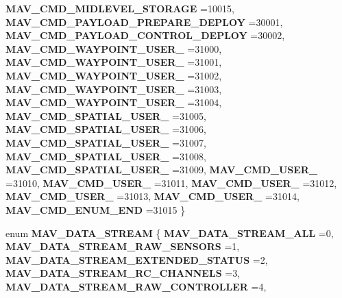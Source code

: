 \begin{DoxyCompactItemize}
\newline
\textbf{ M\+A\+V\+\_\+\+C\+M\+D\+\_\+\+M\+I\+D\+L\+E\+V\+E\+L\+\_\+\+S\+T\+O\+R\+A\+GE} =10015, 
\textbf{ M\+A\+V\+\_\+\+C\+M\+D\+\_\+\+P\+A\+Y\+L\+O\+A\+D\+\_\+\+P\+R\+E\+P\+A\+R\+E\+\_\+\+D\+E\+P\+L\+OY} =30001, 
\textbf{ M\+A\+V\+\_\+\+C\+M\+D\+\_\+\+P\+A\+Y\+L\+O\+A\+D\+\_\+\+C\+O\+N\+T\+R\+O\+L\+\_\+\+D\+E\+P\+L\+OY} =30002, 
\textbf{ M\+A\+V\+\_\+\+C\+M\+D\+\_\+\+W\+A\+Y\+P\+O\+I\+N\+T\+\_\+\+U\+S\+E\+R\+\_} =31000, 
\newline
\textbf{ M\+A\+V\+\_\+\+C\+M\+D\+\_\+\+W\+A\+Y\+P\+O\+I\+N\+T\+\_\+\+U\+S\+E\+R\+\_} =31001, 
\textbf{ M\+A\+V\+\_\+\+C\+M\+D\+\_\+\+W\+A\+Y\+P\+O\+I\+N\+T\+\_\+\+U\+S\+E\+R\+\_} =31002, 
\textbf{ M\+A\+V\+\_\+\+C\+M\+D\+\_\+\+W\+A\+Y\+P\+O\+I\+N\+T\+\_\+\+U\+S\+E\+R\+\_} =31003, 
\textbf{ M\+A\+V\+\_\+\+C\+M\+D\+\_\+\+W\+A\+Y\+P\+O\+I\+N\+T\+\_\+\+U\+S\+E\+R\+\_} =31004, 
\newline
\textbf{ M\+A\+V\+\_\+\+C\+M\+D\+\_\+\+S\+P\+A\+T\+I\+A\+L\+\_\+\+U\+S\+E\+R\+\_} =31005, 
\textbf{ M\+A\+V\+\_\+\+C\+M\+D\+\_\+\+S\+P\+A\+T\+I\+A\+L\+\_\+\+U\+S\+E\+R\+\_} =31006, 
\textbf{ M\+A\+V\+\_\+\+C\+M\+D\+\_\+\+S\+P\+A\+T\+I\+A\+L\+\_\+\+U\+S\+E\+R\+\_} =31007, 
\textbf{ M\+A\+V\+\_\+\+C\+M\+D\+\_\+\+S\+P\+A\+T\+I\+A\+L\+\_\+\+U\+S\+E\+R\+\_} =31008, 
\newline
\textbf{ M\+A\+V\+\_\+\+C\+M\+D\+\_\+\+S\+P\+A\+T\+I\+A\+L\+\_\+\+U\+S\+E\+R\+\_} =31009, 
\textbf{ M\+A\+V\+\_\+\+C\+M\+D\+\_\+\+U\+S\+E\+R\+\_} =31010, 
\textbf{ M\+A\+V\+\_\+\+C\+M\+D\+\_\+\+U\+S\+E\+R\+\_} =31011, 
\textbf{ M\+A\+V\+\_\+\+C\+M\+D\+\_\+\+U\+S\+E\+R\+\_} =31012, 
\newline
\textbf{ M\+A\+V\+\_\+\+C\+M\+D\+\_\+\+U\+S\+E\+R\+\_} =31013, 
\textbf{ M\+A\+V\+\_\+\+C\+M\+D\+\_\+\+U\+S\+E\+R\+\_} =31014, 
\textbf{ M\+A\+V\+\_\+\+C\+M\+D\+\_\+\+E\+N\+U\+M\+\_\+\+E\+ND} =31015
 \}
\item 
enum \textbf{ M\+A\+V\+\_\+\+D\+A\+T\+A\+\_\+\+S\+T\+R\+E\+AM} \{ \newline
\textbf{ M\+A\+V\+\_\+\+D\+A\+T\+A\+\_\+\+S\+T\+R\+E\+A\+M\+\_\+\+A\+LL} =0, 
\textbf{ M\+A\+V\+\_\+\+D\+A\+T\+A\+\_\+\+S\+T\+R\+E\+A\+M\+\_\+\+R\+A\+W\+\_\+\+S\+E\+N\+S\+O\+RS} =1, 
\textbf{ M\+A\+V\+\_\+\+D\+A\+T\+A\+\_\+\+S\+T\+R\+E\+A\+M\+\_\+\+E\+X\+T\+E\+N\+D\+E\+D\+\_\+\+S\+T\+A\+T\+US} =2, 
\textbf{ M\+A\+V\+\_\+\+D\+A\+T\+A\+\_\+\+S\+T\+R\+E\+A\+M\+\_\+\+R\+C\+\_\+\+C\+H\+A\+N\+N\+E\+LS} =3, 
\newline
\textbf{ M\+A\+V\+\_\+\+D\+A\+T\+A\+\_\+\+S\+T\+R\+E\+A\+M\+\_\+\+R\+A\+W\+\_\+\+C\+O\+N\+T\+R\+O\+L\+L\+ER} =4, 

\end{DoxyCompactItemize}
